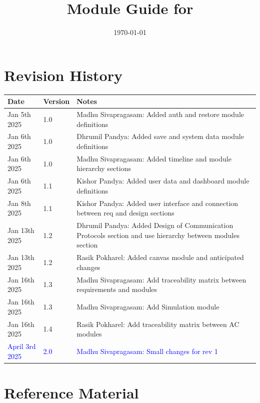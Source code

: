 \documentclass[12pt, titlepage]{article}
\begin{document}
\title{Module Guide for \progname{}} 
\author{\authname}
\date{\today}

\maketitle


\section{Revision History}

\begin{tabularx}{\textwidth}{p{3cm}p{2cm}X}
  \toprule
  {\bf Date} & {\bf Version} & {\bf Notes} \\
  \midrule
  Jan 5th 2025 & 1.0 & Madhu Sivapragasam: Added auth and restore module definitions \\
  Jan 6th 2025 & 1.0 & Dhrumil Pandya: Added save and system data module definitions \\
  Jan 6th 2025 & 1.0 & Madhu Sivapragasam: Added timeline and module hierarchy sections \\
  Jan 6th 2025 & 1.1 & Kishor Pandya: Added user data and dashboard module definitions \\
  Jan 8th 2025 & 1.1 & Kishor Pandya: Added user interface and connection between req and design sections \\
  Jan 13th 2025 & 1.2 & Dhrumil Pandya: Added Design of Communication Protocols section and use hierarchy between modules section \\
  Jan 13th 2025 & 1.2 & Rasik Pokharel: Added canvas module and anticipated changes \\
  Jan 16th 2025 & 1.3 & Madhu Sivapragasam: Add traceability matrix between requirements and modules \\
  Jan 16th 2025 & 1.3 & Madhu Sivapragasam: Add Simulation module \\
  Jan 16th 2025 & 1.4 & Rasik Pokharel: Add traceability matrix between AC modules \\
  \textcolor{blue}{April 3rd 2025} & \textcolor{blue}{2.0} & \textcolor{blue}{Madhu Sivapragasam: Small changes for rev 1} \\
  \bottomrule
  \end{tabularx}
  

\newpage

\section{Reference Material}
\end{document}
